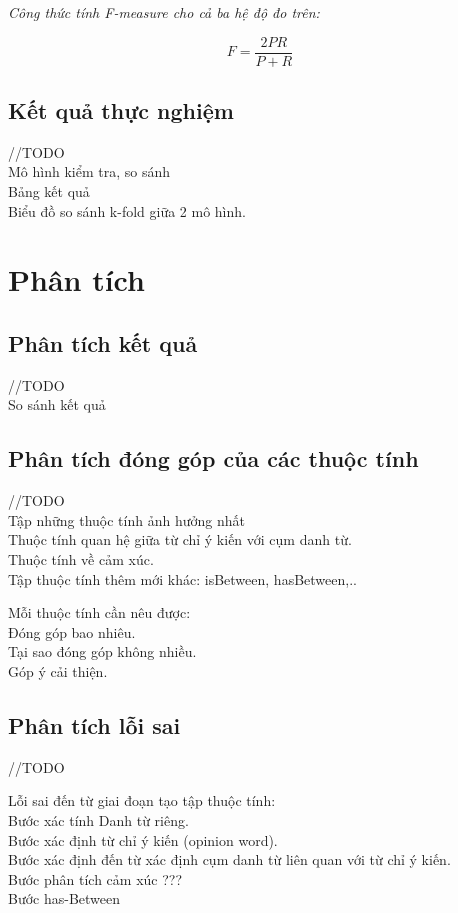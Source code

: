 \documentclass[12pt]{report}
\begin{document}
			\par \textit{Công thức tính F-measure cho cả ba hệ độ đo trên:}
				\begin{center}					
					\begin{equation*}
						F = \frac{2PR}{P+R}
					\end{equation*}
				\end{center}

		\subsection*{Kết quả thực nghiệm}
		//TODO
		\\Mô hình kiểm tra, so sánh
		\\Bảng kết quả
		\\Biểu đồ so sánh k-fold giữa 2 mô hình.

		\section{Phân tích}
			\subsection*{Phân tích kết quả}
			//TODO
			\\So sánh kết quả
			\subsection*{Phân tích đóng góp của các thuộc tính}
			//TODO
			\\Tập những thuộc tính ảnh hưởng nhất
			\\Thuộc tính quan hệ giữa từ chỉ ý kiến với cụm danh từ.
			\\Thuộc tính về cảm xúc.
			\\Tập thuộc tính thêm mới khác: isBetween, hasBetween,..
			\par Mỗi thuộc tính cần nêu được:
			\\Đóng góp bao nhiêu.
			\\Tại sao đóng góp không nhiều.
			\\Góp ý cải thiện.
			\subsection*{Phân tích lỗi sai}
			//TODO
			\par Lỗi sai đến từ giai đoạn tạo tập thuộc tính:
				\\Bước xác tính Danh từ riêng.
				\\Bước xác định từ chỉ ý kiến (opinion word).
				\\Bước xác định đến từ xác định cụm danh từ liên quan với từ chỉ ý kiến.
				\\Bước phân tích cảm xúc ???
				\\Bước has-Between
		
\end{document}
